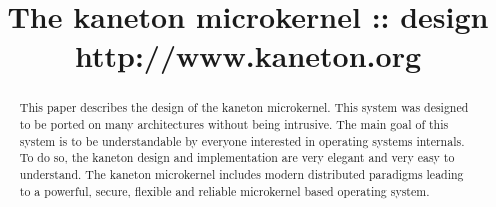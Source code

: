 %
%
%
%
%
%

%
%

%
%

\def\path{../..}

%
%



%
%


%
%

\title{The kaneton microkernel :: design \\
       \scriptsize{http://www.kaneton.org}}

%
%



%
%

\maketitle

%
%

\begin{abstract}

This paper describes the design of the kaneton microkernel.
This system was designed to be ported on many architectures without being
intrusive. The main goal of this system is to be understandable
by everyone interested in operating systems internals. To do so, the kaneton
design and implementation are very elegant and very easy to understand.
The kaneton microkernel includes modern distributed paradigms
leading to a powerful, secure, flexible and reliable microkernel based
operating system.

\end{abstract}

%
%

